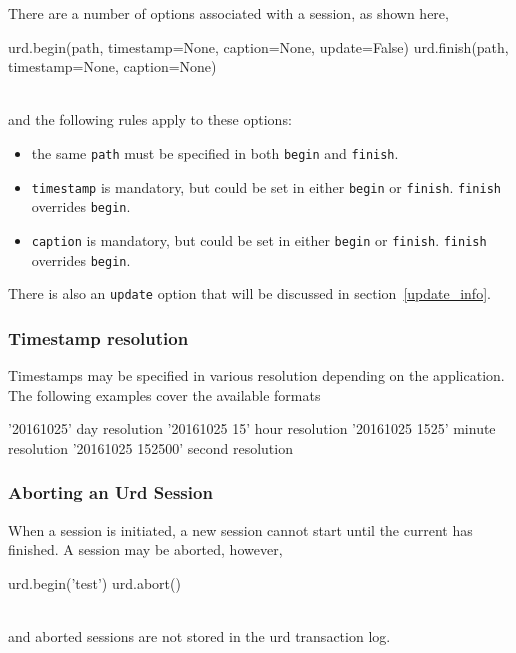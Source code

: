 There are a number of options associated with a session, as shown
here,
\\
\begin{python}
  urd.begin(path, timestamp=None, caption=None, update=False)
  urd.finish(path, timestamp=None, caption=None)
\end{python}
\\
and the following rules apply to these options:
\begin{itemize}
  \item the same \texttt{path} must be specified in both \texttt{begin} and \texttt{finish}.
  \item \texttt{timestamp} is mandatory, but could be set in either \texttt{begin} or
    \texttt{finish}.  \texttt{finish} overrides \texttt{begin}.
  \item \texttt{caption} is mandatory, but could be set in either \texttt{begin} or
    \texttt{finish}.  \texttt{finish} overrides \texttt{begin}.
\end{itemize}
There is also an \texttt{update} option that will be discussed in
section~\ref{update_info}.



\subsubsection{Timestamp resolution}

Timestamps may be specified in various resolution depending on the
application.  The following examples cover the available formats
\\
\begin{python}
   '20161025'              day resolution
   '20161025 15'           hour resolution
   '20161025 1525'         minute resolution
   '20161025 152500'       second resolution
\end{python}



\subsubsection{Aborting an Urd Session}

When a session is initiated, a new session cannot start until the
current has finished.  A session may be aborted, however,
\\
\begin{python}
  urd.begin('test')
  urd.abort()
\end{python}
\\
and aborted sessions are not stored in the urd transaction log.




